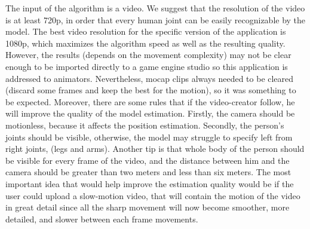The input of the algorithm is a video. We suggest that the resolution of the video is at least 720p, in order that every human joint can be easily recognizable by the model. The best video resolution for the specific version of the application is 1080p, which maximizes the algorithm speed as well as the resulting quality. However, the results (depends on the movement complexity) may not be clear enough to be imported directly to a game engine studio so this application is addressed to animators. Nevertheless, mocap clips always needed to be cleared (discard some frames and keep the best for the motion), so it was something to be expected. Moreover, there are some rules that if the video-creator follow, he will improve the quality of the model estimation. Firstly, the camera should be motionless, because it affects the position estimation. Secondly, the person's joints should be visible, otherwise, the model may struggle to specify left from right joints, (legs and arms). Another tip is that whole body of the person should be visible for every frame of the video, and the distance between him and the camera should be greater than two meters and less than six meters. The most important idea that would help improve the estimation quality would be if the user could upload a slow-motion video, that will contain the motion of the video in great detail since all the sharp movement will now become smoother, more detailed, and slower between each frame movements.
